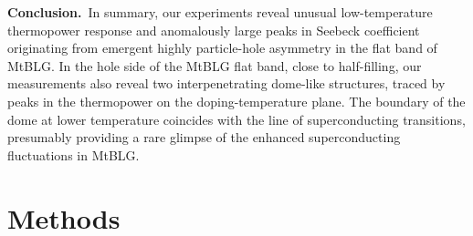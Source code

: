 \documentclass{nature}
\begin{document}
\noindent\textbf{Conclusion.}\ 
In summary, our experiments reveal unusual low-temperature thermopower response and anomalously large peaks in Seebeck coefficient originating from emergent highly particle-hole asymmetry in the flat band of MtBLG. %
In the hole side of the MtBLG flat band, close to half-filling, our measurements also reveal two interpenetrating dome-like structures, traced by peaks in the thermopower on the doping-temperature plane. The boundary of the dome at lower temperature coincides with the line of superconducting transitions, presumably providing a rare glimpse of the enhanced superconducting fluctuations in MtBLG. %


\newpage



\pagebreak
\section{Methods}
\end{document}

